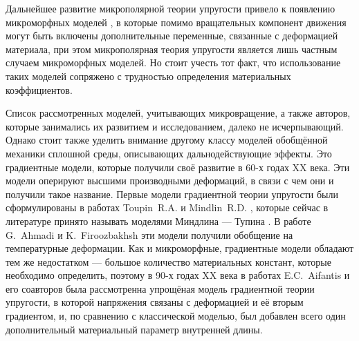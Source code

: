 \ifsynopsis
\else
Дальнейшее развитие микрополярной теории упругости привело к появлению микроморфных моделей \cite{Eringen4, Micromorph1, Micromorph2}, в которые помимо вращательных компонент движения могут быть включены дополнительные переменные, связанные с деформацией материала, при этом микрополярная теория упругости является лишь частным случаем микроморфных моделей. Но стоит учесть тот факт, что использование таких моделей сопряжено с трудностью определения материальных коэффициентов.
\fi

\ifsynopsis
\else
Список рассмотренных моделей, учитывающих микровращение, а также авторов, которые занимались их развитием и исследованием, далеко не исчерпывающий. Однако стоит также уделить внимание другому классу моделей обобщённой механики сплошной среды, описывающих дальнодействующие эффекты. Это градиентные модели, которые получили своё развитие в 60-х годах XX века. Эти модели оперируют высшими производными деформаций, в связи с чем они и получили такое название. Первые модели градиентной теории упругости были сформулированы в работах Toupin~R.A. \cite{Toupin} и Mindlin~R.D. \cite{Mindlin4, Mindlin5}, которые сейчас в литературе принято называть моделями Миндлина --- Тупина \cite{ToupinMindlin1, ToupinMindlin2, ToupinMindlin3}. В работе G.~Ahmadi и K.~Firoozbakhsh \cite{GradientThermoelasticity} эти модели получили обобщение на температурные деформации. Как и микроморфные, градиентные модели обладают тем же недостатком --- большое количество материальных констант, которые необходимо определить, поэтому в 90-х годах XX века в работах E.C.~Aifantis и его соавторов \cite{Aifantis1, Aifantis2} была рассмотренна упрощёная модель градиентной теории упругости, в которой напряжения связаны с деформацией и её вторым градиентом, и, по сравнению с классической моделью, был добавлен всего один дополнительный материальный параметр внутренней длины.
\fi

